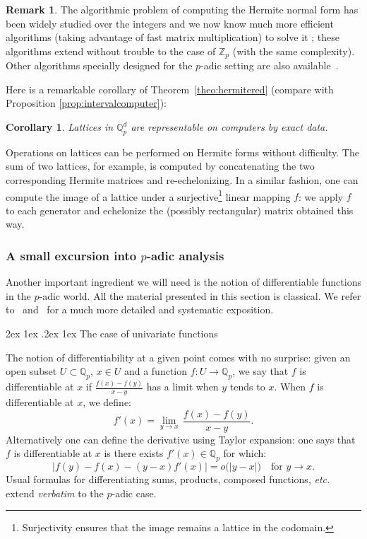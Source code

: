 \documentclass[11pt]{article}
\makeatletter
\numberwithin{equation}{section}
\numberwithin{figure}{section}
\renewcommand\paragraph{\@startsection{paragraph}{4}{\z@}%
                                    {2ex \@plus1ex \@minus.2ex}%
                                    {1ex}%
                                    {\normalfont\normalsize\bfseries}}
\newtheorem{cor}[theo]{Corollary}
\theoremstyle{definition}
\newtheorem{rem}[theo]{Remark}
\newcommand{\Z}{\mathbb Z}
\newcommand{\Zp}{\Z_p}
\newcommand{\Q}{\mathbb Q}
\newcommand{\Qp}{\Q_p}
\makeatother
\begin{document}
\begin{rem}
The algorithmic problem of computing the Hermite normal form has been 
widely studied over the integers and we now know much more efficient 
algorithms (taking advantage of fast matrix multiplication) to solve it 
\cite{KaVi05}; these algorithms extend without trouble to the case 
of $\Zp$ (with the same complexity). Other algorithms specially 
designed for the $p$-adic setting are also available~\cite{Ca12}.
\end{rem}

Here is a remarkable corollary of Theorem~\ref{theo:hermitered}
(compare with Proposition \ref{prop:intervalcomputer}):

\begin{cor}
Lattices in $\Qp^d$ are representable on computers by exact data.
\end{cor}

Operations on lattices can be performed on Hermite forms without 
difficulty. The sum of two lattices, for example, is computed by 
concatenating the two corresponding Hermite matrices and re-echelonizing. 
In a similar fashion, one can compute the image of a lattice under a 
surjective\footnote{Surjectivity ensures that the image remains a 
lattice in the codomain.} linear mapping $f$: we apply $f$ to each 
generator and echelonize the (possibly rectangular) matrix obtained this 
way.

\subsubsection{A small excursion into $p$-adic analysis}
\label{sssec:classC1}

Another important ingredient we will need is the notion of 
differentiable functions in the $p$-adic world. All the material 
presented in this section is classical. We refer to~\cite[\S I.4]{Sc11} 
and~\cite{Co10} for a much more detailed and systematic exposition.

\paragraph{The case of univariate functions}

The notion of differentiability at a given point comes with no surprise: 
given an open subset $U \subset \Qp$, $x \in U$ and a function $f : U 
\to \Qp$, we say that $f$ is differentiable at $x$ if $\frac{f(x) - 
f(y)} {x-y}$ has a limit when $y$ tends to $x$. 
When $f$ is differentiable at $x$, we define:
$$f'(x) = \lim_{y \to x} \, \frac{f(x) - f(y)} {x-y}.$$
Alternatively one can define the derivative using Taylor expansion: one
says that $f$ is differentiable at $x$ is there exists $f'(x) \in \Qp$
for which:
\begin{equation}
\label{eq:defdiff}
\big|f(y) - f(x) - (y{-}x) f'(x)\big| = o\big(|y{-}x|\big)
\quad \text{for } y \to x.
\end{equation}
Usual formulas for differentiating sums, products, composed functions,
\emph{etc.} extend \emph{verbatim} to the $p$-adic case.
\end{document}

